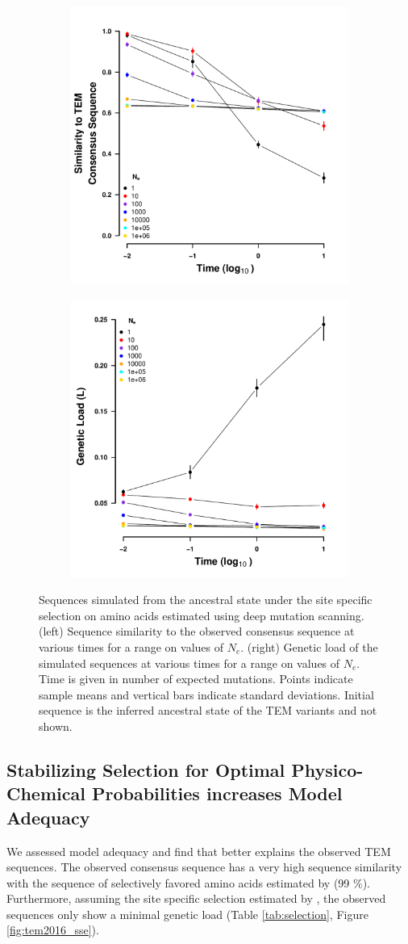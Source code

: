 \documentclass[12pt]{article}
\begin{document}
\begin{figure}[h]
    \centering
    \begin{subfigure}
        \centering
        \includegraphics[width=.45\textwidth]{img/simulated_dist_time_DMS_ancest.pdf}
    \end{subfigure}
    \begin{subfigure}
        \centering
        \includegraphics[width=.45\textwidth]{img/simulated_gl_time_DMS_ancest.pdf}
    \end{subfigure}
    \caption{Sequences simulated from the ancestral state under the site specific selection on amino acids estimated using deep mutation scanning. 
    (left) Sequence similarity to the observed consensus sequence at various times for a range on values of $N_e$.
    (right) Genetic load of the simulated sequences at various times for a range on values of $N_e$.
    Time is given in number of expected mutations.
    Points indicate sample means and vertical bars indicate standard deviations. Initial sequence is the inferred ancestral state of the TEM variants and not shown.}
    \label{fig:dms_sim}
\end{figure}

\subsection*{Stabilizing Selection for Optimal Physico-Chemical Probabilities increases Model Adequacy} 
We assessed model adequacy and find that \selac better explains the observed TEM sequences.
The observed consensus sequence has a very high sequence similarity with the sequence of selectively favored amino acids estimated by \selac (99 \%).
Furthermore, assuming the site specific selection estimated by \selac, the observed sequences only show a minimal genetic load (Table \ref{tab:selection}, Figure \ref{fig:tem2016_sse}).
\end{document}
